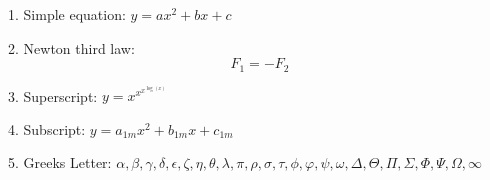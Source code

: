 \documentclass[11pt]{article}
\begin{document}
1. Simple equation: $y = ax^2 + bx + c$

2. Newton third law: $$F_1 = -F_2$$

3. Superscript: $y = x^{x^{x^{\log(x)}}}$

4. Subscript: $y = a_{1m}x^2+b_{1m}x+c_{1m}$

5. Greeks Letter: $\alpha, \beta, \gamma, \delta, \epsilon, \zeta, \eta, \theta, \lambda, \pi, \rho, \sigma, \tau, \phi, \varphi, \psi, \omega, \Delta, \Theta, \Pi, \Sigma, \Phi, \Psi, \Omega, \infty$
\end{document}
